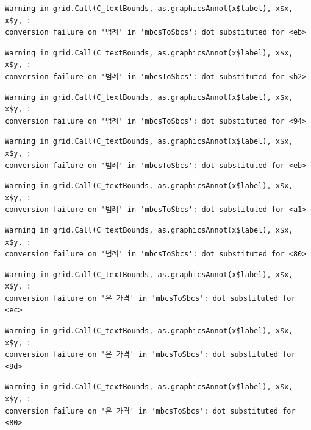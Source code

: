 \documentclass[
  letterpaper,
  DIV=11,
  numbers=noendperiod]{scrreprt}
\begin{document}
\begin{verbatim}
Warning in grid.Call(C_textBounds, as.graphicsAnnot(x$label), x$x, x$y, :
conversion failure on '범례' in 'mbcsToSbcs': dot substituted for <eb>
\end{verbatim}

\begin{verbatim}
Warning in grid.Call(C_textBounds, as.graphicsAnnot(x$label), x$x, x$y, :
conversion failure on '범례' in 'mbcsToSbcs': dot substituted for <b2>
\end{verbatim}

\begin{verbatim}
Warning in grid.Call(C_textBounds, as.graphicsAnnot(x$label), x$x, x$y, :
conversion failure on '범례' in 'mbcsToSbcs': dot substituted for <94>
\end{verbatim}

\begin{verbatim}
Warning in grid.Call(C_textBounds, as.graphicsAnnot(x$label), x$x, x$y, :
conversion failure on '범례' in 'mbcsToSbcs': dot substituted for <eb>
\end{verbatim}

\begin{verbatim}
Warning in grid.Call(C_textBounds, as.graphicsAnnot(x$label), x$x, x$y, :
conversion failure on '범례' in 'mbcsToSbcs': dot substituted for <a1>
\end{verbatim}

\begin{verbatim}
Warning in grid.Call(C_textBounds, as.graphicsAnnot(x$label), x$x, x$y, :
conversion failure on '범례' in 'mbcsToSbcs': dot substituted for <80>
\end{verbatim}

\begin{verbatim}
Warning in grid.Call(C_textBounds, as.graphicsAnnot(x$label), x$x, x$y, :
conversion failure on '은 가격' in 'mbcsToSbcs': dot substituted for <ec>
\end{verbatim}

\begin{verbatim}
Warning in grid.Call(C_textBounds, as.graphicsAnnot(x$label), x$x, x$y, :
conversion failure on '은 가격' in 'mbcsToSbcs': dot substituted for <9d>
\end{verbatim}

\begin{verbatim}
Warning in grid.Call(C_textBounds, as.graphicsAnnot(x$label), x$x, x$y, :
conversion failure on '은 가격' in 'mbcsToSbcs': dot substituted for <80>
\end{verbatim}
\end{document}
